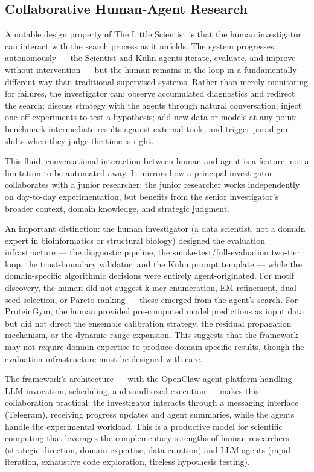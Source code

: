 \documentclass[11pt,a4paper]{article}
\begin{document}
\subsection{Collaborative Human-Agent Research}

A notable design property of The Little Scientist is that the human investigator can interact with the search process as it unfolds. The system progresses autonomously --- the Scientist and Kuhn agents iterate, evaluate, and improve without intervention --- but the human remains in the loop in a fundamentally different way than traditional supervised systems. Rather than merely monitoring for failures, the investigator can: observe accumulated diagnostics and redirect the search; discuss strategy with the agents through natural conversation; inject one-off experiments to test a hypothesis; add new data or models at any point; benchmark intermediate results against external tools; and trigger paradigm shifts when they judge the time is right.

This fluid, conversational interaction between human and agent is a feature, not a limitation to be automated away. It mirrors how a principal investigator collaborates with a junior researcher: the junior researcher works independently on day-to-day experimentation, but benefits from the senior investigator's broader context, domain knowledge, and strategic judgment.

An important distinction: the human investigator (a data scientist, not a domain expert in bioinformatics or structural biology) designed the evaluation infrastructure --- the diagnostic pipeline, the smoke-test/full-evaluation two-tier loop, the trust-boundary validator, and the Kuhn prompt template --- while the domain-specific algorithmic decisions were entirely agent-originated. For motif discovery, the human did not suggest k-mer enumeration, EM refinement, dual-seed selection, or Pareto ranking --- these emerged from the agent's search. For ProteinGym, the human provided pre-computed model predictions as input data but did not direct the ensemble calibration strategy, the residual propagation mechanism, or the dynamic range expansion. This suggests that the framework may not require domain expertise to produce domain-specific results, though the evaluation infrastructure must be designed with care.

The framework's architecture --- with the OpenClaw agent platform handling LLM invocation, scheduling, and sandboxed execution --- makes this collaboration practical: the investigator interacts through a messaging interface (Telegram), receiving progress updates and agent summaries, while the agents handle the experimental workload. This is a productive model for scientific computing that leverages the complementary strengths of human researchers (strategic direction, domain expertise, data curation) and LLM agents (rapid iteration, exhaustive code exploration, tireless hypothesis testing).
\end{document}

